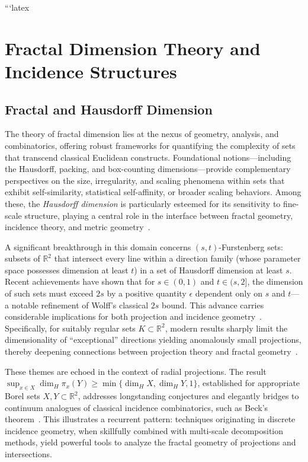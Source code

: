 \documentclass[11pt]{article}
\begin{document}
```latex
\section{Fractal Dimension Theory and Incidence Structures}
\subsection{Fractal and Hausdorff Dimension}

The theory of fractal dimension lies at the nexus of geometry, analysis, and combinatorics, offering robust frameworks for quantifying the complexity of sets that transcend classical Euclidean constructs. Foundational notions—including the Hausdorff, packing, and box-counting dimensions—provide complementary perspectives on the size, irregularity, and scaling phenomena within sets that exhibit self-similarity, statistical self-affinity, or broader scaling behaviors. Among these, the \emph{Hausdorff dimension} is particularly esteemed for its sensitivity to fine-scale structure, playing a central role in the interface between fractal geometry, incidence theory, and metric geometry~\cite{ref68}.

A significant breakthrough in this domain concerns $(s, t)$-Furstenberg sets: subsets of $\mathbb{R}^2$ that intersect every line within a direction family (whose parameter space possesses dimension at least $t$) in a set of Hausdorff dimension at least $s$. Recent achievements have shown that for $s \in (0,1)$ and $t\in(s,2]$, the dimension of such sets must exceed $2s$ by a positive quantity $\epsilon$ dependent only on $s$ and $t$—a notable refinement of Wolff's classical $2s$ bound. This advance carries considerable implications for both projection and incidence geometry~\cite{ref68}. Specifically, for suitably regular sets $K \subset \mathbb{R}^2$, modern results sharply limit the dimensionality of ``exceptional'' directions yielding anomalously small projections, thereby deepening connections between projection theory and fractal geometry~\cite{ref68}.

These themes are echoed in the context of radial projections. The result $\sup_{x \in X} \dim_H \pi_x(Y) \geq \min\{ \dim_H X, \dim_H Y, 1 \}$, established for appropriate Borel sets $X, Y \subset \mathbb{R}^2$, addresses longstanding conjectures and elegantly bridges to continuum analogues of classical incidence combinatorics, such as Beck's theorem~\cite{ref92}. This illustrates a recurrent pattern: techniques originating in discrete incidence geometry, when skillfully combined with multi-scale decomposition methods, yield powerful tools to analyze the fractal geometry of projections and intersections.
\end{document}
